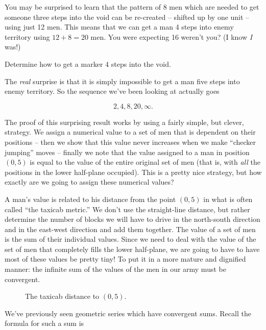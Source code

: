 You may be surprised to learn that the pattern of 8 men which are needed to
get someone three steps into the void can be re-created -- shifted up by one
unit -- using just 12 men.  This means that we can get a man 4 steps into
enemy territory using $12 + 8 = 20$ men.  You were expecting 16 weren't you?
(I know \emph{I} was!)

\begin{exer}
Determine how to get a marker 4 steps into the void.
\end{exer}

The \emph{real} surprise is that it is simply impossible to get a man five
steps into enemy territory.  So the sequence we've been looking at actually
goes 

\[ 2, 4, 8, 20, \infty. \] 

The proof of this surprising result works by using a fairly simple, but
clever, strategy.  We assign a numerical value to a set of men that is 
dependent on their positions -- then we show that this value never increases
when we make ``checker jumping'' moves -- finally we note that the 
value assigned to a man in position $(0,5)$ is equal to the value of the
entire original set of men (that is, with \emph{all} the positions in the lower
half-plane occupied).  This is a pretty nice strategy, but how exactly are
we going to assign these numerical values?

A man's value is related to his distance from the point $(0,5)$ in what
is often called ``the taxicab metric.''   We don't use the straight-line
distance, but rather determine the number of blocks we will have to drive
in the north-south direction and in the east-west direction and add them 
together.  The value of a set of men is the sum of their individual values.
Since we need to deal with the value of the set of men that completely fills
the lower half-plane, we are going to have to have most of these values be
pretty tiny!  To put it in a more mature and dignified manner: the infinite
sum of the values of the men in our army must be convergent.

\begin{figure}[!hbtp] 
\begin{center}

\end{center}
\caption[The taxicab distance to $(0,5)$.]{The taxicab distance to $(0,5)$.}
\label{fig:taxicab_distance}
\end{figure}

We've previously seen geometric series which have convergent sums.  Recall 
the formula for such a sum is

